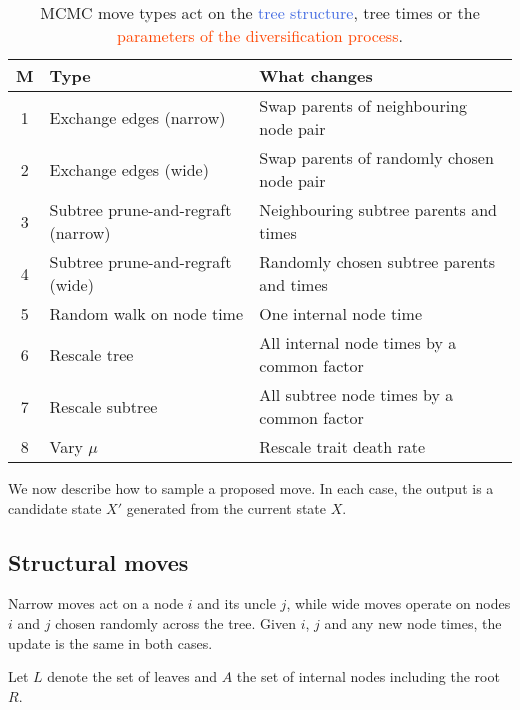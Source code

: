 \documentclass[11pt,a4paper]{article}
\begin{document}
\begin{table}[htb]
    \centering
    \caption{MCMC move types act on the \textcolor{RoyalBlue}{tree structure}, \textcolor{YellowOrange}{tree times} or the \textcolor{OrangeRed}{parameters of the diversification process}.}
    \label{tab:moves-uncoupled}
    \begin{tabular}{cll}
        \toprule
        M & Type & What changes \\ \midrule
        \rowcolor{RoyalBlue!50}
        1 & Exchange edges (narrow) & Swap parents of neighbouring node pair \\
        \rowcolor{RoyalBlue!50}
        2 & Exchange edges (wide) & Swap parents of randomly chosen node pair \\
        \rowcolor{RoyalBlue!50}
        3 & Subtree prune-and-regraft (narrow) & Neighbouring subtree parents and times \\
        \rowcolor{RoyalBlue!50}
        4 & Subtree prune-and-regraft (wide) & Randomly chosen subtree parents and times \\
        \rowcolor{YellowOrange!50}
        5 & Random walk on node time & One internal node time \\
        \rowcolor{YellowOrange!50}
        6 & Rescale tree & All internal node times by a common factor \\
        \rowcolor{YellowOrange!50}
        7 & Rescale subtree & All subtree node times by a common factor \\
        \rowcolor{OrangeRed!50}
        8 & Vary $ \mu $ & Rescale trait death rate \\
        \bottomrule
    \end{tabular}
\end{table}

We now describe how to sample a proposed move. In each case, the output is a candidate state $ X' $ generated from the current state $ X $.

\subsection{Structural moves}

Narrow moves act on a node $ i $ and its uncle $ j $, while wide moves operate on nodes $ i $ and $ j $ chosen randomly across the tree. Given $ i $, $ j $ and any new node times, the update is the same in both cases.

Let $ L $ denote the set of leaves and $ A $ the set of internal nodes including the root $ R $.
\end{document}
